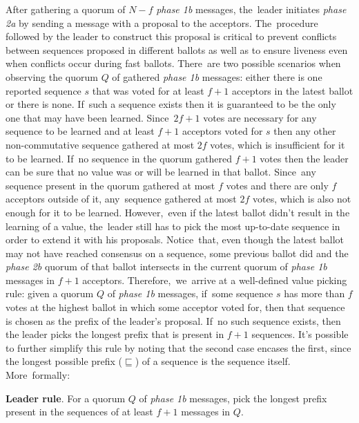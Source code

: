 \documentclass[algorithms,article,accept,moreauthors,pdftex,10pt,a4paper]{Definitions/mdpi}
\begin{document}
After gathering a quorum of $N-f$ \textit{phase 1b} messages, the~leader initiates \textit{phase 2a} by sending a message with a proposal to the acceptors. The~procedure followed by the leader to construct this proposal is critical to prevent conflicts between sequences proposed in different ballots as well as to ensure liveness even when conflicts occur during fast ballots. There~are two possible scenarios when observing the quorum $Q$ of gathered \textit{phase 1b} messages: either there is one reported sequence $s$ that was voted for at least $f+1$ acceptors in the latest ballot or there is none. If~such a sequence exists then it is guaranteed to be the only one that may have been learned. Since~$2f+1$ votes are necessary for any sequence to be learned and at least $f+1$ acceptors voted for $s$ then any other non-commutative sequence gathered at most $2f$ votes, which is insufficient for it to be learned. If~no sequence in the quorum gathered $f+1$ votes then the leader can be sure that no value was or will be learned in that ballot. Since~any sequence present in the quorum gathered at most $f$ votes and there are only $f$ acceptors outside of it, any~sequence gathered at most $2f$ votes, which is also not enough for it to be learned. However,~even if the latest ballot didn't result in the learning of a value, the~leader still has to pick the most up-to-date sequence in order to extend it with his proposals. Notice~that, even though the latest ballot may not have reached consensus on a sequence, some previous ballot did and the \textit{phase 2b} quorum of that ballot intersects in the current quorum of \textit{phase 1b} messages in $f+1$ acceptors. Therefore,~we~arrive at a well-defined value picking rule: given a quorum $Q$ of \textit{phase 1b} messages, if~some sequence $s$ has more than $f$ votes at the highest ballot in which some acceptor voted for, then that sequence is chosen as the prefix of the leader's proposal. If~no such sequence exists, then the leader picks the longest prefix that is present in $f+1$ sequences. It's possible to further simplify this rule by noting that the second case encases the first, since the longest possible prefix ($\sqsubseteq$) of a sequence is the sequence itself. More~formally:

\begin{displayquote}
\textbf{Leader rule}. For a quorum $Q$ of \textit{phase 1b} messages, pick the longest prefix present in the sequences of at least $f+1$ messages in $Q$. 
\end{displayquote}
\end{document}
